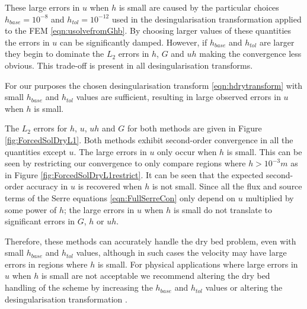 These large errors in $u$ when $h$ is small are caused by the particular choices $h_{{base}} = 10^{-8}$ and $h_{{tol}}  = 10^{-12}$ used in the desingularisation transformation applied to the FEM \eqref{eqn:usolvefromGhb}. By choosing larger values of these quantities the errors in $u$ can be significantly damped. However, if $h_{{base}}$ and $h_{{tol}}$ are larger they begin to dominate the $L_2$ errors in $h$, $G$ and $uh$ making the convergence less obvious. This trade-off is present in all desingularisation transforms. 

For our purposes the chosen desingularisation transform \eqref{eqn:hdrytransform} with small $h_{{base}}$ and $h_{{tol}}$ values are sufficient, resulting in large observed errors in $u$ when $h$ is small.


The $L_2$ errors for $h$, $u$, $uh$ and $G$ for both methods are given in Figure \ref{fig:ForcedSolDryL1}. Both methods exhibit second-order convergence in all the quantities except $u$. The large errors in $u$ only occur when $h$ is small. This can be seen by restricting our convergence to only compare regions where $h > 10^{-3} m$ as in Figure \ref{fig:ForcedSolDryL1restrict}. It can be seen that the expected second-order accuracy in $u$ is recovered when $h$ is not small. Since all the flux and source terms of the Serre equations \eqref{eqn:FullSerreCon} only depend on $u$ multiplied by some power of $h$; the large errors in $u$ when $h$ is small do not translate to significant errors in $G$, $h$ or $uh$. 

Therefore, these methods can accurately handle the dry bed problem, even with small $h_{{base}}$ and $h_{{tol}}$ values, although in such cases the velocity may have large errors in regions where $h$ is small. For physical applications where large errors in $u$ when $h$ is small are not acceptable we recommend altering the dry bed handling of the scheme by increasing the $h_{{base}}$ and $h_{{tol}}$ values or altering the desingularisation transformation \cite{Kurganov-Petrova-2007-707}. 

